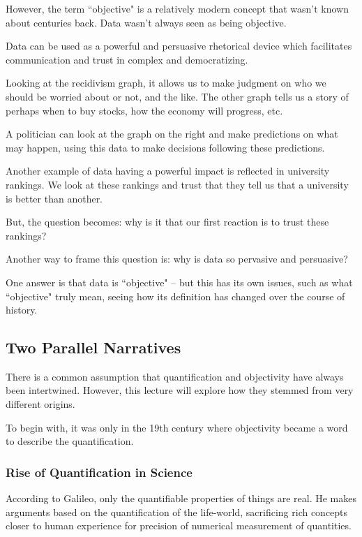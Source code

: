 \documentclass[openany]{book}
\begin{document}
However, the term ``objective" is a relatively modern concept that wasn't known about centuries back. Data wasn't always seen as being objective.

\begin{rmk}
	Data can be used as a powerful and persuasive rhetorical device which facilitates communication and trust in complex and democratizing.
\end{rmk}


Looking at the recidivism graph, it allows us to make judgment on who we should be worried about or not, and the like. The other graph tells us a story of perhaps when to buy stocks, how the economy will progress, etc.

A politician can look at the graph on the right and make predictions on what may happen, using this data to make decisions following these predictions.

\begin{example}
	Another example of data having a powerful impact is reflected in university rankings. We look at these rankings and trust that they tell us that a university is better than another.
\end{example}

But, the question becomes: why is it that our first reaction is to trust these rankings?

Another way to frame this question is: why is data so pervasive and persuasive?

One answer is that data is ``objective" -- but this has its own issues, such as what ``objective" truly mean, seeing how its definition has changed over the course of history.

\subsection{Two Parallel Narratives}
There is a common assumption that quantification and objectivity have always been intertwined. However, this lecture will explore how they stemmed from very different origins.

To begin with, it was only in the 19th century where objectivity became a word to describe the quantification.

\subsubsection{Rise of Quantification in Science}
According to Galileo, only the quantifiable properties of things are real. He makes arguments based on the quantification of the life-world, sacrificing rich concepts closer to human experience for precision of numerical measurement of quantities.
\end{document}
